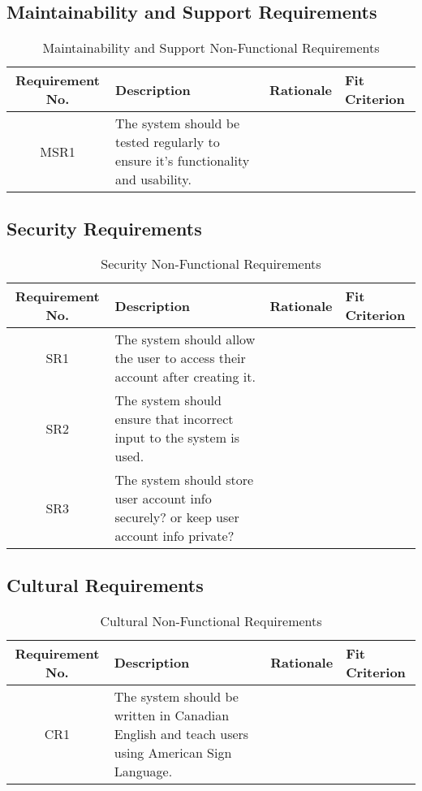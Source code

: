 \documentclass[12pt, titlepage]{article}
\begin{document}
\subsection{Maintainability and Support Requirements}

\begin{table}[H]
\caption{Maintainability and Support Non-Functional Requirements}
\noindent \begin{tabular}{| c | p{3cm}| p{3cm}| p{3cm}|}
\toprule 
\textbf{Requirement No.} & \textbf{Description} & \textbf{Rationale} & \textbf{Fit Criterion}\\
\midrule
MSR1 & The system should be tested regularly to ensure it's functionality and usability. & & \\
\bottomrule
\end{tabular}
\end{table}


\subsection{Security Requirements}

\begin{table}[H]
\caption{Security Non-Functional Requirements}
\noindent \begin{tabular}{| c | p{3cm}| p{3cm}| p{3cm}|}
\toprule 
\textbf{Requirement No.} & \textbf{Description} & \textbf{Rationale} & \textbf{Fit Criterion}\\
\midrule
SR1 & The system should allow the user to access their account after creating it. & & \\
\hline
SR2 & The system should ensure that incorrect input to the system is used. & & \\
\hline
SR3 & The system should store user account info securely? or keep user account info private? & & \\
\bottomrule
\end{tabular}
\end{table}

\subsection{Cultural Requirements}

\begin{table}[H]
\caption{Cultural Non-Functional Requirements}
\noindent \begin{tabular}{| c | p{3cm}| p{3cm}| p{3cm}|}
\toprule 
\textbf{Requirement No.} & \textbf{Description} & \textbf{Rationale} & \textbf{Fit Criterion}\\
\midrule
CR1 & The system should be written in Canadian English and teach users using American Sign Language.  & & \\
\bottomrule
\end{tabular}
\end{table}
\end{document}
